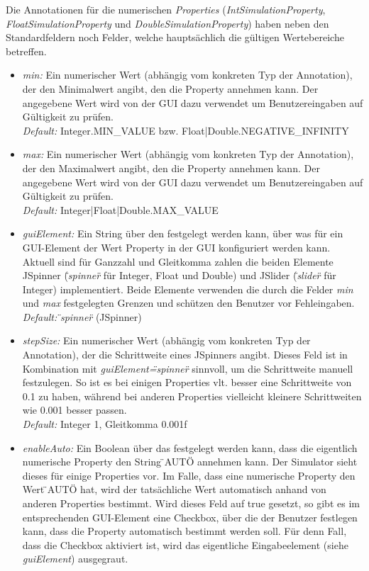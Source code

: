 \documentclass[a4paper, 11pt]{article} %
\begin{document}
Die Annotationen für die numerischen \emph{Properties} (\emph{IntSimulationProperty}, \emph{FloatSimulationProperty} und \emph{DoubleSimulationProperty}) haben neben den Standardfeldern noch Felder, welche hauptsächlich die gültigen Wertebereiche betreffen.
\begin{itemize}
	\item \emph{min:} Ein numerischer Wert (abhängig vom konkreten Typ der Annotation), der den Minimalwert angibt, den die Property annehmen kann. Der angegebene Wert wird von der GUI dazu verwendet um Benutzereingaben auf Gültigkeit zu prüfen.\\
	\emph{Default:} Integer.MIN\_VALUE bzw. Float|Double.NEGATIVE\_INFINITY
	\item \emph{max:} Ein numerischer Wert (abhängig vom konkreten Typ der Annotation), der den Maximalwert angibt, den die Property annehmen kann. Der angegebene Wert wird von der GUI dazu verwendet um Benutzereingaben auf Gültigkeit zu prüfen.\\
	\emph{Default:} Integer|Float|Double.MAX\_VALUE
	\item \emph{guiElement:} Ein String über den festgelegt werden kann, über was für ein GUI-Element der Wert Property in der GUI konfiguriert werden kann. Aktuell sind für Ganzzahl und Gleitkomma zahlen die beiden Elemente JSpinner (\emph{\"{}spinner\"{}} für Integer, Float und Double) und JSlider (\emph{\"{}slider\"{}} für Integer) implementiert. Beide Elemente verwenden die durch die Felder \emph{min} und \emph{max} festgelegten Grenzen und schützen den Benutzer vor Fehleingaben.\\
	\emph{Default:} \emph{\"{}spinner\"{}} (JSpinner)
	\item \emph{stepSize:} Ein numerischer Wert (abhängig vom konkreten Typ der Annotation), der die Schrittweite eines JSpinners angibt. Dieses Feld ist in Kombination mit \emph{guiElement=\"{}spinner\"{}} sinnvoll, um die Schrittweite manuell festzulegen. So ist es bei einigen Properties vlt. besser eine Schrittweite von 0.1 zu haben, während bei anderen Properties vielleicht kleinere Schrittweiten wie 0.001 besser passen.\\
	\emph{Default:} Integer 1, Gleitkomma 0.001f
	\item \emph{enableAuto:} Ein Boolean über das festgelegt werden kann, dass die eigentlich numerische Property den String \"{}AUTO\"{} annehmen kann. Der Simulator sieht dieses für einige Properties vor. Im Falle, dass eine numerische Property den Wert \"{}AUTO\"{} hat, wird der tatsächliche Wert automatisch anhand von anderen Properties bestimmt. Wird dieses Feld auf true gesetzt, so gibt es im entsprechenden GUI-Element eine Checkbox, über die der Benutzer festlegen kann, dass die Property automatisch bestimmt werden soll. Für denn Fall, dass  die Checkbox aktiviert ist, wird das eigentliche Eingabeelement (siehe \emph{guiElement}) ausgegraut.\\

\end{itemize}
\end{document}
